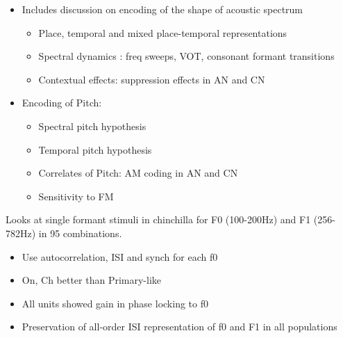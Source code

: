 \documentclass[10pt,a4paper]{article}
\begin{document}
\begin{itemize}
\item Includes discussion on encoding of the shape of acoustic spectrum

  \begin{itemize}
  \item Place, temporal and mixed place-temporal representations
  \item Spectral dynamics : freq sweeps, VOT, consonant formant transitions
  \item Contextual effects: suppression effects in AN and CN
  \end{itemize}
\item Encoding of Pitch:

  \begin{itemize}
  \item Spectral pitch hypothesis
  \item Temporal pitch hypothesis
  \item Correlates of Pitch: AM coding in AN and CN
  \item Sensitivity to FM
  \end{itemize}
\end{itemize}
\citep{Rhode:1998} Looks at single formant stimuli in chinchilla for F0
(100-200Hz) and F1 (256-782Hz) in 95 combinations.


\begin{itemize}
\item Use autocorrelation, ISI and synch for each f0
\item On, Ch better than Primary-like
\item All units showed gain in phase locking to f0
\item Preservation of all-order ISI representation of f0 and F1 in all
  populations
\end{itemize}


\subsection{\citep{ClareyPaoliniEtAl:2004}}
\end{document}
